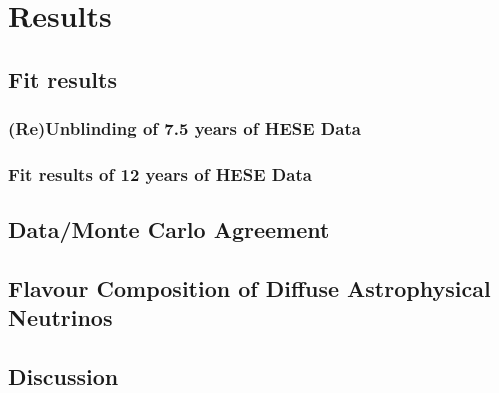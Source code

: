 \setchapterpreamble[u]{\margintoc}
\chapter{Results}

\section{Fit results}
\label{sec:fit_results}

\subsection{(Re)Unblinding of 7.5 years of HESE Data}
\label{sec:HESE7}

\subsection{Fit results of 12 years of HESE Data}
\label{sec:HESE12}

\section{Data/Monte Carlo Agreement}
\label{sec:data_mc}

\section{Flavour Composition of Diffuse Astrophysical Neutrinos}
\label{sec:flavour_results}

\section{Discussion}
\label{sec:results_discussion}